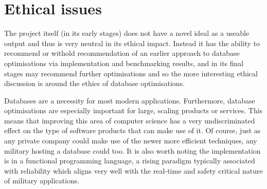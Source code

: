 \chapter{Ethical issues} %
\begin{comment}
What are the wider ethical, legal, professional and societal issues surrounding your project and the accompanying research? You should use the ethics checklist as the basis for this discussion. 
\end{comment}
The project itself (in its early stages) does not have a novel ideal as a useable output and thus is very neutral in its ethical impact. Instead it has the ability to recommend or withold recommendation of an earlier approach to database optimisations via implementation and benchmarking results, and in its final stages may recommend further optimisations and so the more interesting ethical discussion is around the ethics of database optimisations.


Databases are a necessity for most modern applications. Furthermore, database optimisations are especially important for large, scaling products or services. This means that improving this area of computer science has a very undiscriminated effect on the type of software products that can make use of it. Of course, just as any private company could make use of the newer more efficient techniques, any military hosting a database could too. It is also worth noting the implementation is in a functional programming language, a rising paradigm  typically associated with reliability   which aligns very well with the real-time and safety critical nature of military applications. 




